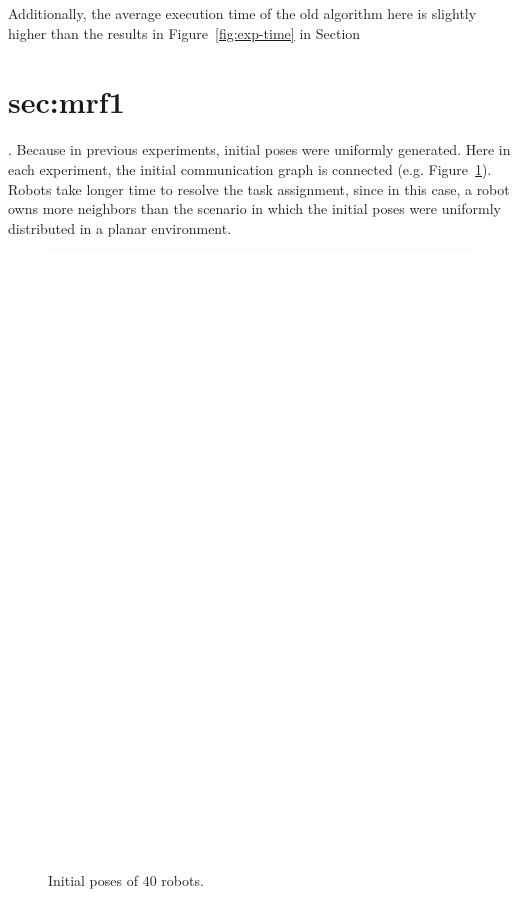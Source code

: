  Additionally, the average execution time of the old algorithm here is slightly higher than the results in Figure~\ref{fig:exp-time} in Section~\section{sec:mrf1}. 
  Because in previous experiments, initial poses were uniformly generated. 
  Here in each experiment, the initial communication graph is connected (e.g. Figure~\ref{fig:init40}).
  Robots take longer time to resolve the task assignment, since in this case,
  a robot owns more neighbors than the scenario in which the initial poses were uniformly distributed in a planar environment.
  
  \begin{figure}
    \centering   
    \includegraphics[scale=0.45]{figs/initSnapshot}
    \label{fig:init40}
    \caption{Initial poses of $40$ robots.}
  \end{figure}

